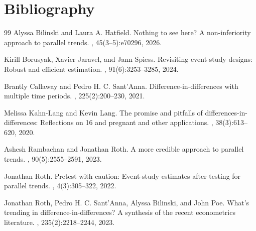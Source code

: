 \documentclass[11pt]{article}
\theoremstyle{definition}
\theoremstyle{plain}
\theoremstyle{remark}
\begin{document}
\section*{Bibliography}
\begin{thebibliography}{99}
Alyssa Bilinski and Laura A. Hatfield.
\newblock Nothing to see here? A non-inferiority approach to parallel trends.
, 45(3--5):e70296, 2026.

Kirill Borusyak, Xavier Jaravel, and Jann Spiess.
\newblock Revisiting event-study designs: Robust and efficient estimation.
, 91(6):3253--3285, 2024.

Brantly Callaway and Pedro H. C. Sant'Anna.
\newblock Difference-in-differences with multiple time periods.
, 225(2):200--230, 2021.

Melissa Kahn-Lang and Kevin Lang.
\newblock The promise and pitfalls of differences-in-differences: Reflections on 16 and pregnant and other applications.
, 38(3):613--620, 2020.

Ashesh Rambachan and Jonathan Roth.
\newblock A more credible approach to parallel trends.
, 90(5):2555--2591, 2023.

Jonathan Roth.
\newblock Pretest with caution: Event-study estimates after testing for parallel trends.
, 4(3):305--322, 2022.

Jonathan Roth, Pedro H. C. Sant'Anna, Alyssa Bilinski, and John Poe.
\newblock What's trending in difference-in-differences? A synthesis of the recent econometrics literature.
, 235(2):2218--2244, 2023.
\end{thebibliography}
\end{document}
